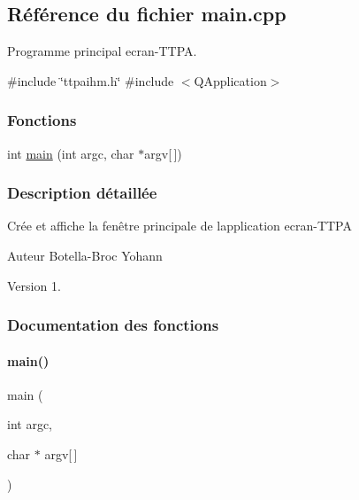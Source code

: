 \hypertarget{ecran-_t_t_p_a_2main_8cpp}{}\subsection{Référence du fichier main.\+cpp}
\label{ecran-_t_t_p_a_2main_8cpp}


Programme principal ecran-\/\+T\+T\+PA.  


{\ttfamily \#include \char`\"{}ttpaihm.\+h\char`\"{}}\newline
{\ttfamily \#include $<$Q\+Application$>$}\newline
\subsubsection*{Fonctions}
\begin{DoxyCompactItemize}
\item 
int \hyperlink{ecran-_t_t_p_a_2main_8cpp_ae0665038b72011f5c680c660fcb59459}{main} (int argc, char $\ast$argv\mbox{[}$\,$\mbox{]})
\end{DoxyCompactItemize}


\subsubsection{Description détaillée}
Crée et affiche la fenêtre principale de l\textquotesingle{}application ecran-\/\+T\+T\+PA

\begin{DoxyAuthor}{Auteur}
Botella-\/\+Broc Yohann
\end{DoxyAuthor}
\begin{DoxyVersion}{Version}
1. 
\end{DoxyVersion}


\subsubsection{Documentation des fonctions}
\mbox{\label{ecran-_t_t_p_a_2main_8cpp_ae0665038b72011f5c680c660fcb59459}} 
\paragraph{\texorpdfstring{main()}{main()}}
{\footnotesize\ttfamily main (\begin{DoxyParamCaption}\item[{int}]{argc,  }\item[{char $\ast$}]{argv\mbox{[}$\,$\mbox{]} }\end{DoxyParamCaption})}


